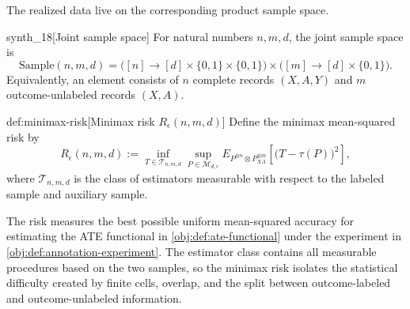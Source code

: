 The realized data live on the corresponding product sample space.

\begin{definitionv}{synth_18}[Joint sample space]
For natural numbers \(n,m,d\), the joint sample space is
\[
\mathrm{Sample}(n,m,d)
=
\bigl([n]\to [d]\times\{0,1\}\times\{0,1\}\bigr)
\times
\bigl([m]\to [d]\times\{0,1\}\bigr).
\]
Equivalently, an element consists of \(n\) complete records \((X,A,Y)\) and \(m\) outcome-unlabeled records \((X,A)\).
\end{definitionv}

\begin{definitionv}{def:minimax-risk}[Minimax risk \(R_\epsilon(n,m,d)\)]
Define the minimax mean-squared risk by
\[
R_\epsilon(n,m,d)
:=
\inf_{T\in\mathcal T_{n,m,d}}
\sup_{P\in\mathcal M_{d,\epsilon}}
E_{P^{\otimes n}\otimes P_{XA}^{\otimes m}}
\!\left[\bigl(T-\tau(P)\bigr)^2\right],
\]
where \(\mathcal T_{n,m,d}\) is the class of estimators measurable with respect to the labeled sample and auxiliary sample.
\end{definitionv}

The risk  measures the best possible uniform mean-squared accuracy for estimating the ATE functional in \cref{obj:def:ate-functional} under the experiment in \cref{obj:def:annotation-experiment}. The estimator class  contains all measurable procedures based on the two samples, so the minimax risk isolates the statistical difficulty created by finite cells, overlap, and the split between outcome-labeled and outcome-unlabeled information.
